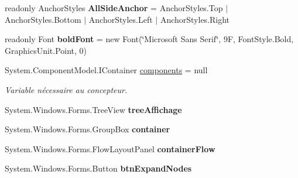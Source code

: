\begin{DoxyCompactItemize}
\item 
\mbox{\label{class_m_t_connect_agent_1_1_user_control_display_tab_aa600efb65adb7313ed6e5ec98c84863c}} 
readonly Anchor\+Styles {\bfseries All\+Side\+Anchor} = Anchor\+Styles.\+Top $\vert$ Anchor\+Styles.\+Bottom $\vert$ Anchor\+Styles.\+Left $\vert$ Anchor\+Styles.\+Right
\item 
\mbox{\label{class_m_t_connect_agent_1_1_user_control_display_tab_a2de53bacd7b44a121af957bda6d0faa4}} 
readonly Font {\bfseries bold\+Font} = new Font(\char`\"{}Microsoft Sans Serif\char`\"{}, 9\+F, Font\+Style.\+Bold, Graphics\+Unit.\+Point, 0)
\item 
System.\+Component\+Model.\+I\+Container \mbox{\hyperlink{class_m_t_connect_agent_1_1_user_control_display_tab_a69ab804e102c9f7530a0441d2dd65da6}{components}} = null
\begin{DoxyCompactList}\small\item\em Variable nécessaire au concepteur. \end{DoxyCompactList}\item 
\mbox{\label{class_m_t_connect_agent_1_1_user_control_display_tab_ac4f4ff399ae001cb2d8774b58a4e5532}} 
System.\+Windows.\+Forms.\+Tree\+View {\bfseries tree\+Affichage}
\item 
\mbox{\label{class_m_t_connect_agent_1_1_user_control_display_tab_a0f26e5be51a11045133d1bdd3b8ebaee}} 
System.\+Windows.\+Forms.\+Group\+Box {\bfseries container}
\item 
\mbox{\label{class_m_t_connect_agent_1_1_user_control_display_tab_a11dd621a8bf6a2d3b0be91f20fc0c9f0}} 
System.\+Windows.\+Forms.\+Flow\+Layout\+Panel {\bfseries container\+Flow}
\item 
\mbox{\label{class_m_t_connect_agent_1_1_user_control_display_tab_ad2e73116a8315b183e006850caa767ad}} 
System.\+Windows.\+Forms.\+Button {\bfseries btn\+Expand\+Nodes}
\item 
\mbox{\label{class_m_t_connect_agent_1_1_user_control_display_tab_aa39615008797ebe155e99322a8a0e020}} 

\end{DoxyCompactItemize}
